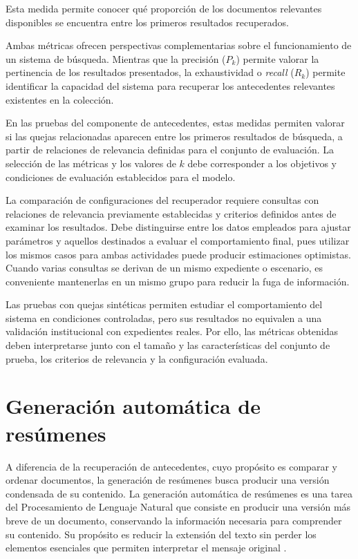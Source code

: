 Esta medida permite conocer qué proporción de los documentos relevantes disponibles se encuentra entre los primeros resultados recuperados.

Ambas métricas ofrecen perspectivas complementarias sobre el funcionamiento de un sistema de búsqueda. Mientras que la precisión ($P_k$) permite valorar la pertinencia de los resultados presentados, la exhaustividad o \textit{recall} ($R_k$) permite identificar la capacidad del sistema para recuperar los antecedentes relevantes existentes en la colección.

En las pruebas del componente de antecedentes, estas medidas permiten valorar si las quejas relacionadas aparecen entre los primeros resultados de búsqueda, a partir de relaciones de relevancia definidas para el conjunto de evaluación. La selección de las métricas y los valores de $k$ debe corresponder a los objetivos y condiciones de evaluación establecidos para el modelo.

La comparación de configuraciones del recuperador requiere consultas con relaciones de relevancia previamente establecidas y criterios definidos antes de examinar los resultados. Debe distinguirse entre los datos empleados para ajustar parámetros y aquellos destinados a evaluar el comportamiento final, pues utilizar los mismos casos para ambas actividades puede producir estimaciones optimistas. Cuando varias consultas se derivan de un mismo expediente o escenario, es conveniente mantenerlas en un mismo grupo para reducir la fuga de información.

Las pruebas con quejas sintéticas permiten estudiar el comportamiento del sistema en condiciones controladas, pero sus resultados no equivalen a una validación institucional con expedientes reales. Por ello, las métricas obtenidas deben interpretarse junto con el tamaño y las características del conjunto de prueba, los criterios de relevancia y la configuración evaluada.

\section{Generación automática de resúmenes}
\label{sec:generacion_resumenes}

A diferencia de la recuperación de antecedentes, cuyo propósito es comparar y ordenar documentos, la generación de resúmenes busca producir una versión condensada de su contenido. La generación automática de resúmenes es una tarea del Procesamiento de Lenguaje Natural que consiste en producir una versión más breve de un documento, conservando la información necesaria para comprender su contenido. Su propósito es reducir la extensión del texto sin perder los elementos esenciales que permiten interpretar el mensaje original \cite{jurafsky2023slp}.

